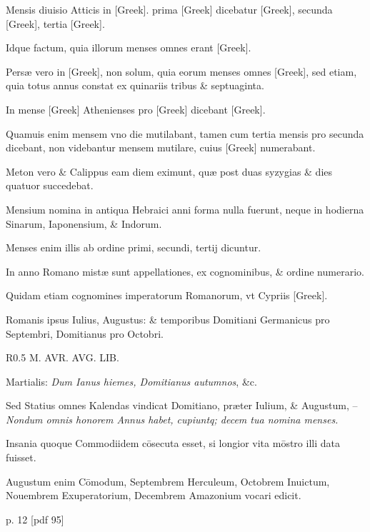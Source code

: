 Mensis diuisio Atticis in \textgreek{[Greek]}.
 prima \textgreek{[Greek]} dicebatur \textgreek{[Greek]},
secunda \textgreek{[Greek]}, tertia \textgreek{[Greek]}.

Idque factum, quia
illorum menses omnes erant \textgreek{[Greek]}.

Persæ vero in \textgreek{[Greek]},
non solum, quia eorum menses omnes \textgreek{[Greek]}, sed etiam, quia
totus annus constat ex quinariis tribus \& septuaginta.

In mense \textgreek{[Greek]}
Athenienses pro \textgreek{[Greek]} dicebant \textgreek{[Greek]}.

Quamuis
enim mensem vno die mutilabant, tamen cum tertia mensis
pro secunda dicebant, non videbantur mensem mutilare, cuius
\textgreek{[Greek]} numerabant.

Meton vero \& Calippus eam diem eximunt,
quæ post duas syzygias \& dies quatuor succedebat.

Mensium nomina
in antiqua Hebraici anni forma nulla fuerunt, neque in hodierna
Sinarum, Iaponensium, \& Indorum.

Menses enim illis ab ordine
primi, secundi, tertij dicuntur.

In anno Romano mistæ sunt appellationes,
ex cognominibus, \& ordine numerario.

Quidam etiam cognomines
imperatorum Romanorum, vt Cypriis \textgreek{[Greek]}.

Romanis ipsus Iulius, Augustus: \& temporibus Domitiani
Germanicus pro Septembri, Domitianus pro Octobri.

\begin{wrapfigure}[16]{R}{0.5\textwidth}
  \centering
  {M. AVR. AVG. LIB.}
\end{wrapfigure}

Martialis:
 \textit{Dum Ianus hiemes, Domitianus
autumnos}, \&c.

Sed Statius omnes
Kalendas vindicat Domitiano,
præter Iulium, \& Augustum,
– \textit{Nondum omnis honorem
Annus habet, cupiuntq; decem tua
nomina menses.}

Insania quoque
Commodiidem cōsecuta esset, si
longior vita mōstro illi data fuisset.

Augustum enim Cōmodum,
Septembrem Herculeum, Octobrem
Inuictum, Nouembrem
Exuperatorium, Decembrem
Amazonium vocari edicit.



p. 12 [pdf 95]


